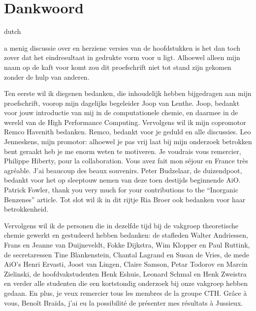 \chapter*{Dankwoord}
\label{dankwoord}
\fancyhead[RO]{\thepage}
\fancyhead[LE]{\thepage}
\begin{otherlanguage*}{dutch}

\lettrine{}{}a menig discussie over en herziene versies van de hoofdstukken is het dan toch zover dat het eindresultaat in gedrukte vorm voor u ligt. Alhoewel alleen mijn naam op de kaft voor komt zou dit proefschrift niet tot stand zijn gekomen zonder de hulp van anderen.

Ten eerste wil ik diegenen bedanken, die inhoudelijk hebben bijgedragen aan mijn proefschrift, voorop mijn dagelijks begeleider Joop van Lenthe. Joop, bedankt voor jouw introductie van mij in de computationele chemie, en daarmee in de wereld van de High Performance Computing. Vervolgens wil ik mijn copromotor Remco Havenith bedanken. Remco, bedankt voor je geduld en alle discussies. Leo Jenneskens, mijn promotor: alhoewel je pas vrij laat bij mijn onderzoek betrokken bent geraakt heb je me enorm weten te motiveren. Je voudrais vous remercier, Philippe Hiberty, pour la collaboration. Vous avez fait mon s\'{e}jour en France tr\`{e}s agr\'{e}able. J'ai beaucoup des beaux souvenirs. Peter Budzelaar, de duizendpoot, bedankt voor het op sleeptouw nemen van deze toen destijds beginnende AiO. Patrick Fowler, thank you very much for your contributions to the ``Inorganic Benzenes'' article. Tot slot wil ik in dit rijtje Ria Broer ook bedanken voor haar betrokkenheid.

Vervolgens wil ik de personen die in dezelfde tijd bij de vakgroep theoretische chemie gewerkt en gestudeerd hebben bedanken: de stafleden Walter Andriessen, Frans en Jeanne van Duijneveldt, Fokke Dijkstra, Wim Klopper en Paul Ruttink, de secretaressen Tine Blankenstein, Chantal Lagrand en Susan de Vries, de mede AiO's Henri Ervasti, Joost van Lingen, Claire Samson, Petar Todorov en Marcin Zielinski, de hoofdvakstudenten Henk Eshuis, Leonard Schmal en Henk Zweistra en verder alle studenten die een kortstondig onderzoek bij onze vakgroep hebben gedaan. En plus, je veux remercier tous les membres de la groupe CTH. Gr\^{a}ce \`{a} vous, Beno\^{i}t Bra\"{i}da, j'ai eu la possibilit\'{e} de pr\'{e}senter mes r\'{e}sultats \`{a} Jussieux.


\end{otherlanguage*}
